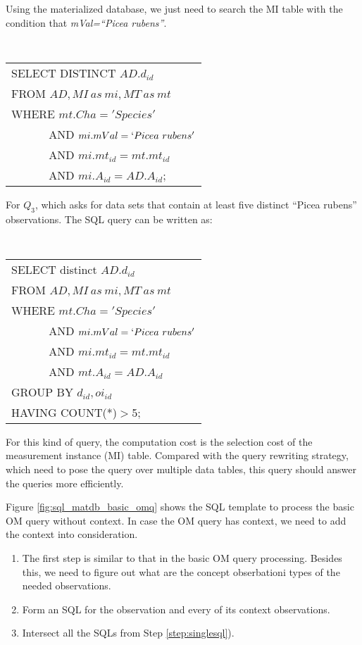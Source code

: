 \begin{example} \label{eg:materialize_db_q1}
Using the  materialized database,  we just need to search the MI table
with the condition that {\em mVal=``Picea rubens''}.

\vspace{0.1in}
{\tt
\begin{tabular}{l}
SELECT DISTINCT $AD.d_{id}$\\
FROM $AD, MI~as~mi, MT~as~mt$\\
WHERE $mt.Cha='Species'$ \\
$\qquad\quad$ AND $mi.mVal = `Picea~rubens'$\\
$\qquad\quad$ AND $mi.mt_{id}=mt.mt_{id}$\\
$\qquad\quad$ AND $mi.A_{id}=AD.A_{id}$;
\end{tabular}
}
\vspace{0.1in}

For $Q_3$, which asks for data sets that contain at
least five distinct ``Picea rubens'' observations.
The SQL query can be written as:

\vspace{0.1in}
{\tt
\begin{tabular}{l}
SELECT distinct $AD.d_{id}$\\
FROM $AD, MI~as~mi, MT~as~mt$\\
WHERE $mt.Cha='Species'$ \\
$\qquad\quad$ AND $mi.mVal = `Picea~rubens'$\\
$\qquad\quad$ AND $mi.mt_{id}=mt.mt_{id}$\\
$\qquad\quad$ AND $mt.A_{id}=AD.A_{id}$\\
GROUP BY $d_{id},oi_{id}$\\
HAVING COUNT(*)$>$5;
\end{tabular}
}
\vspace{0.1in}
\end{example}

For this kind of query, the computation cost is the selection cost of the
measurement instance (MI) table.
Compared with the query rewriting strategy, which need to pose the
query over multiple data tables, this query should answer the queries
more efficiently.

Figure \ref{fig:sql_matdb_basic_omq} shows the SQL template to process
the basic OM query without context. In case the OM query has context,
we need to add the context into consideration.

\begin{enumerate}
\item The first step is similar to that in the basic OM query
  processing. Besides this, we need to figure out what are the concept
  obserbationi types of the needed observations.
\item \label{step:singlesql} Form an SQL for the observation and every of its context
  observations.
\item Intersect all the SQLs from Step \ref{step:singlesql}).
\end{enumerate}


